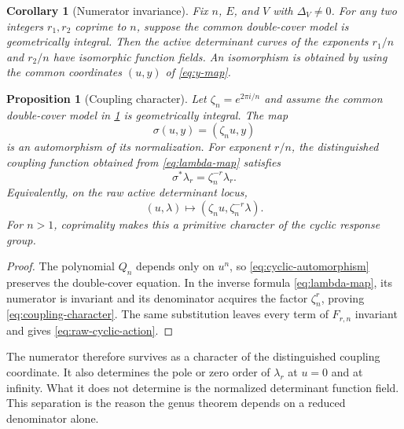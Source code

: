 \documentclass[11pt,reqno]{amsart}
\newtheorem{proposition}[theorem]{Proposition}
\newtheorem{corollary}[theorem]{Corollary}
\theoremstyle{remark}
\begin{document}
\begin{corollary}[Numerator invariance]\label{cor:numerator-invariance}
Fix $n$, $E$, and $V$ with $\Delta_V\ne0$.  For any two integers $r_1,r_2$
coprime to $n$, suppose the common double-cover model is geometrically
integral.  Then the active determinant curves of the exponents $r_1/n$ and
$r_2/n$ have isomorphic function fields.  An isomorphism is obtained by using
the common coordinates $(u,y)$ of \eqref{eq:y-map}.
\end{corollary}

\begin{proposition}[Coupling character]\label{prop:coupling-character}
Let $\zeta_n=e^{2\pi i/n}$ and assume the common double-cover model in
\cref{cor:numerator-invariance} is geometrically integral.  The map
\begin{equation}\label{eq:cyclic-automorphism}
 \sigma(u,y)=(\zeta_nu,y)
\end{equation}
is an automorphism of its normalization.  For exponent $r/n$, the distinguished
coupling function obtained from \eqref{eq:lambda-map} satisfies
\begin{equation}\label{eq:coupling-character}
 \sigma^*\lambda_r=\zeta_n^{-r}\lambda_r.
\end{equation}
Equivalently, on the raw active determinant locus,
\begin{equation}\label{eq:raw-cyclic-action}
 (u,\lambda)\longmapsto(\zeta_nu,\zeta_n^{-r}\lambda).
\end{equation}
For $n>1$, coprimality makes this a primitive character of the cyclic response
group.
\end{proposition}

\begin{proof}
The polynomial $Q_n$ depends only on $u^n$, so
\eqref{eq:cyclic-automorphism} preserves the double-cover equation.  In the
inverse formula \eqref{eq:lambda-map}, its numerator is invariant and its
denominator acquires the factor $\zeta_n^r$, proving
\eqref{eq:coupling-character}.  The same substitution leaves every term of
$F_{r,n}$ invariant and gives \eqref{eq:raw-cyclic-action}.
\end{proof}

The numerator therefore survives as a character of the distinguished coupling
coordinate.  It also determines the pole or zero order of $\lambda_r$ at
$u=0$ and at infinity.  What it does not determine is the normalized
determinant function field.  This separation is the reason the genus theorem
depends on a reduced denominator alone.
\end{document}
